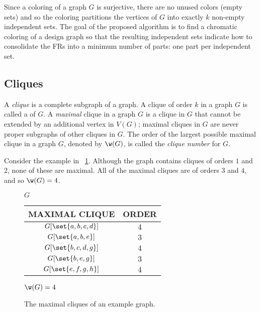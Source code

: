 Since a  coloring of a graph \(G\) is surjective, there are no unused colors (empty sets) and so the
coloring partitions the vertices of \(G\) into exactly \(k\) non-empty independent sets.  The goal of the proposed
algorithm is to find a chromatic coloring of a design graph so that the resulting independent sets indicate how to
consolidate the FRs into a minimum number of parts: one part per independent set.

\subsection{Cliques}\label{sec:sub:cliques}

A \emph{clique} is a complete subgraph of a graph.  A clique of order \(k\) in a graph \(G\) is called a 
of \(G\).  A \emph{maximal} clique in a graph \(G\) is a clique in \(G\) that cannot be extended by an additional
vertex in \(V(G)\); maximal cliques in \(G\) are never proper subgraphs of other cliques in \(G\).  The order of
the largest possible maximal clique in a graph \(G\), denoted by \(\w(G)\), is called the \emph{clique number} for
\(G\).

Consider the example in \figurename~\ref{fig:clique}.  Although the graph contains cliques of orders \(1\) and
\(2\), none of these are maximal.  All of the maximal cliques are of orders \(3\) and \(4\), and so \(\w(G)=4\).

\begin{figure}[H]
  \begin{minipage}{3.25in}
    \centering

    \(G\)
  \end{minipage}
  \begin{minipage}{2.5in}
    \centering
    \begin{tabular}{c|c}
      MAXIMAL CLIQUE & ORDER \\
      \hline
      \(G[\set{a, b, c, d}]\) & \(4\) \\
      \(G[\set{a, b, e}]\) & \(3\) \\
      \(G[\set{b, c, d, g}]\) & \(4\) \\
      \(G[\set{b, e, g}]\) & \(3\) \\
      \(G[\set{e, f, g, h}]\) & \(4\)
    \end{tabular}

    \bigskip

    \(\w(G)=4\)
  \end{minipage}
  \caption{The maximal cliques of an example graph.}
  \label{fig:clique}
\end{figure}

